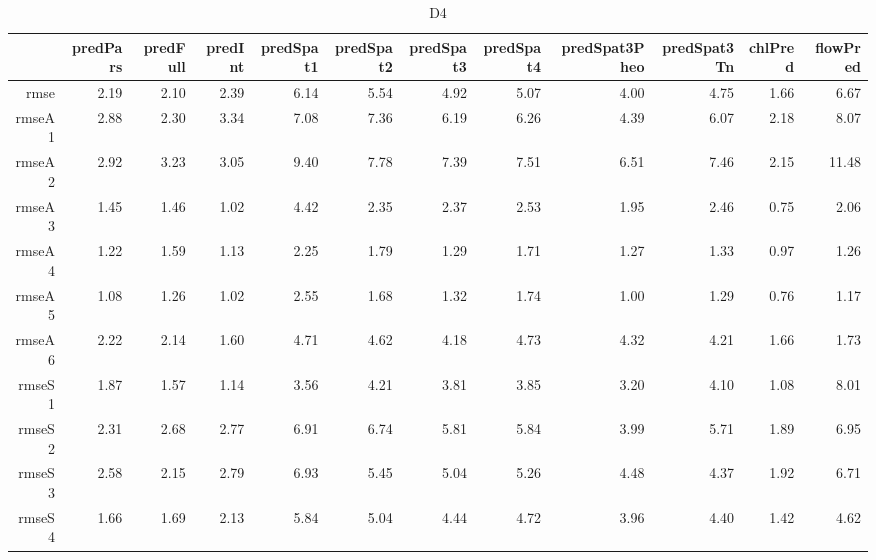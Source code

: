 \begin{table}[H]
\centering
\begingroup\fontsize{2.5pt}{4pt}\selectfont
\begin{tabular}{rrrrrrrrrrrr}
  \hline
 & predPars & predFull & predInt & predSpat1 & predSpat2 & predSpat3 & predSpat4 & predSpat3Pheo & predSpat3Tn & chlPred & flowPred \\ 
  \hline
rmse & 2.19 & 2.10 & 2.39 & 6.14 & 5.54 & 4.92 & 5.07 & 4.00 & 4.75 & 1.66 & 6.67 \\ 
  rmseA1 & 2.88 & 2.30 & 3.34 & 7.08 & 7.36 & 6.19 & 6.26 & 4.39 & 6.07 & 2.18 & 8.07 \\ 
  rmseA2 & 2.92 & 3.23 & 3.05 & 9.40 & 7.78 & 7.39 & 7.51 & 6.51 & 7.46 & 2.15 & 11.48 \\ 
  rmseA3 & 1.45 & 1.46 & 1.02 & 4.42 & 2.35 & 2.37 & 2.53 & 1.95 & 2.46 & 0.75 & 2.06 \\ 
  rmseA4 & 1.22 & 1.59 & 1.13 & 2.25 & 1.79 & 1.29 & 1.71 & 1.27 & 1.33 & 0.97 & 1.26 \\ 
  rmseA5 & 1.08 & 1.26 & 1.02 & 2.55 & 1.68 & 1.32 & 1.74 & 1.00 & 1.29 & 0.76 & 1.17 \\ 
  rmseA6 & 2.22 & 2.14 & 1.60 & 4.71 & 4.62 & 4.18 & 4.73 & 4.32 & 4.21 & 1.66 & 1.73 \\ 
  rmseS1 & 1.87 & 1.57 & 1.14 & 3.56 & 4.21 & 3.81 & 3.85 & 3.20 & 4.10 & 1.08 & 8.01 \\ 
  rmseS2 & 2.31 & 2.68 & 2.77 & 6.91 & 6.74 & 5.81 & 5.84 & 3.99 & 5.71 & 1.89 & 6.95 \\ 
  rmseS3 & 2.58 & 2.15 & 2.79 & 6.93 & 5.45 & 5.04 & 5.26 & 4.48 & 4.37 & 1.92 & 6.71 \\ 
  rmseS4 & 1.66 & 1.69 & 2.13 & 5.84 & 5.04 & 4.44 & 4.72 & 3.96 & 4.40 & 1.42 & 4.62 \\ 
   \hline
\end{tabular}
\endgroup
\caption{D4} 
\end{table}
